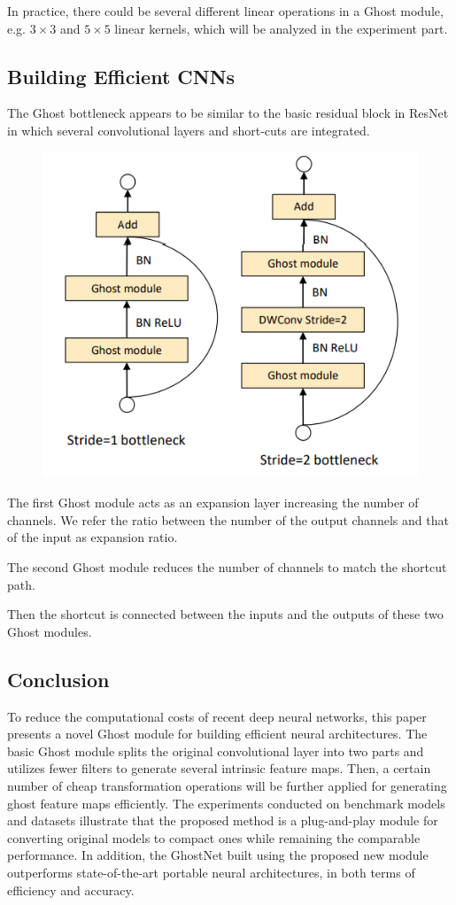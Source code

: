 \documentclass[11pt]{article}
\begin{document}
In practice, there could be several different linear operations in a Ghost module, e.g.
$3\times 3$ and $5\times 5$ linear kernels, which will be analyzed in the experiment part.
\subsection{Building Efficient CNNs}
The Ghost bottleneck appears to be similar to the basic residual block in ResNet in which several convolutional layers and short-cuts are integrated.
\begin{figure}[H]
	\centering
	\includegraphics[scale = 0.5]{68}
\end{figure}
The first Ghost module acts as an expansion layer increasing the number of channels. We refer the ratio between the number of the output channels and that of the input as expansion ratio.

The second Ghost module reduces the number of channels to match the shortcut path.

Then the shortcut is connected between the inputs and the outputs of these two Ghost modules.
\subsection{Conclusion}
To reduce the computational costs of recent deep neural networks, this paper presents a novel Ghost module for building efficient neural architectures. The basic Ghost module
splits the original convolutional layer into two parts and utilizes fewer filters to generate several intrinsic feature maps. Then, a certain number of cheap transformation operations will be further applied for generating ghost feature maps efficiently. The experiments conducted on benchmark models and datasets illustrate that the proposed method is a plug-and-play module for converting original models to compact ones while remaining the comparable performance. In addition, the GhostNet built using the proposed new module outperforms state-of-the-art portable neural architectures, in both terms of efficiency and accuracy.
\end{document}
